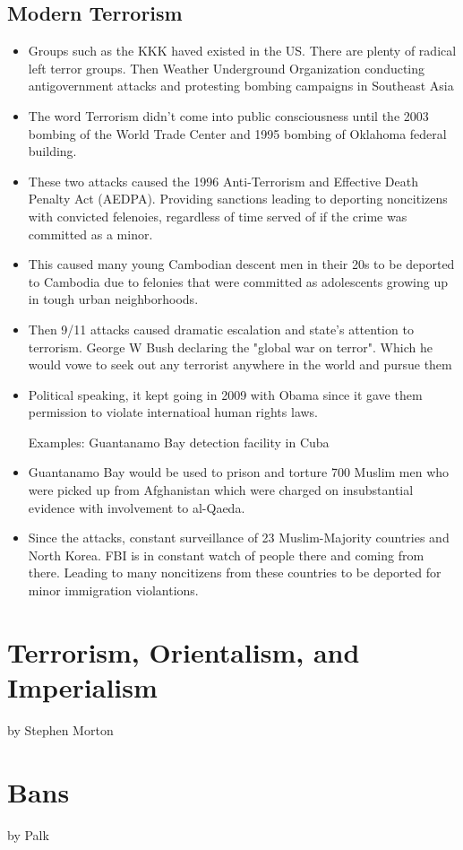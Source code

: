 \documentclass{article}
\begin{document}
\subsection{Modern Terrorism}
\begin{itemize}
  \item Groups such as the KKK haved existed in the US.
    There are plenty of radical left terror groups.
    Then Weather Underground Organization conducting antigovernment attacks
    and protesting bombing campaigns in Southeast Asia
  \item The word Terrorism didn't come into public consciousness until the 2003 bombing
    of the World Trade Center and 1995 bombing of Oklahoma federal building.
  \item These two attacks caused the 1996 Anti-Terrorism and Effective
    Death Penalty Act (AEDPA).
    Providing sanctions leading to deporting noncitizens with convicted felenoies,
    regardless of time served of if the crime was committed as a minor.
  \item This caused many young Cambodian descent men in their 20s to be deported
    to Cambodia due to felonies that were committed as adolescents growing up
    in tough urban neighborhoods.
  \item Then 9/11 attacks caused dramatic escalation and state's attention to terrorism.
    George W Bush declaring the "global war on terror".
    Which he would vowe to seek out any terrorist anywhere in the world and pursue them
  \item Political speaking, it kept going in 2009 with Obama since it gave them
    permission to violate internatioal human rights laws.

    Examples:
    Guantanamo Bay detection facility in Cuba
  \item Guantanamo Bay would be used to prison and torture 700 Muslim men who were
    picked up from Afghanistan which were charged on insubstantial evidence with
    involvement to al-Qaeda.
  \item Since the attacks, constant surveillance of 23 Muslim-Majority countries and
    North Korea. FBI is in constant watch of people there and coming from there.
    Leading to many noncitizens from these countries to be deported
    for minor immigration violantions.

\end{itemize}


\section{Terrorism, Orientalism, and Imperialism}
by Stephen Morton

\section{Bans}
by Palk
\end{document}
